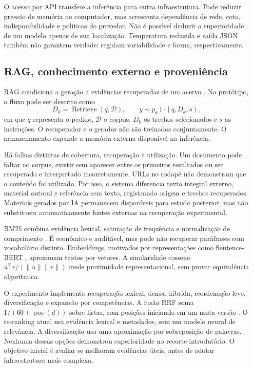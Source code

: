 \documentclass[12pt]{article}
\begin{document}
O acesso por API transfere a inferência para outra infraestrutura. Pode reduzir pressão de memória no computador, mas acrescenta dependência de rede, cota, indisponibilidade e políticas do provedor. Não é possível deduzir a superioridade de um modelo apenas de sua localização. Temperatura reduzida e saída JSON também não garantem verdade: regulam variabilidade e forma, respectivamente.

\subsection{RAG, conhecimento externo e proveniência}
RAG condiciona a geração a evidências recuperadas de um acervo \cite{lewis2020}. No protótipo, o fluxo pode ser descrito como
\begin{equation}
 D_k=\operatorname{Retrieve}(q,\mathcal{D}),\qquad
 y\sim p_\theta(\cdot\mid q,D_k,s),
\end{equation}
em que $q$ representa o pedido, $\mathcal{D}$ o corpus, $D_k$ os trechos selecionados e $s$ as instruções. O recuperador e o gerador não são treinados conjuntamente. O armazenamento expande a memória externa disponível na inferência.

Há falhas distintas de cobertura, recuperação e utilização. Um documento pode faltar no corpus, existir sem aparecer entre os primeiros resultados ou ser recuperado e interpretado incorretamente. URLs no rodapé não demonstram que o conteúdo foi utilizado. Por isso, o sistema diferencia texto integral externo, material autoral e referência sem texto, registrando origem e trechos recuperados. Materiais gerados por IA permanecem disponíveis para estudo posterior, mas não substituem automaticamente fontes externas na recuperação experimental.

BM25 combina evidência lexical, saturação de frequência e normalização de comprimento \cite{robertson2009}. É econômico e auditável, mas pode não recuperar paráfrases com vocabulário distinto. Embeddings, motivados por representações como Sentence-BERT \cite{reimers2019}, aproximam textos por vetores. A similaridade cosseno $u^\top v/(\|u\|\|v\|)$ mede proximidade representacional, sem provar equivalência algorítmica.

O experimento implementa recuperação lexical, densa, híbrida, reordenação leve, diversificação e expansão por competências. A fusão RRF soma $1/(60+\operatorname{pos}(d))$ sobre listas, com posições iniciando em um nesta versão \cite{cormack2009}. O re-ranking atual usa evidência lexical e metadados, sem um modelo neural de relevância. A diversificação usa uma aproximação por sobreposição de palavras. Nenhuma dessas opções demonstrou superioridade no recorte introdutório. O objetivo inicial é avaliar se melhoram evidências úteis, antes de adotar infraestrutura mais complexa.
\end{document}
